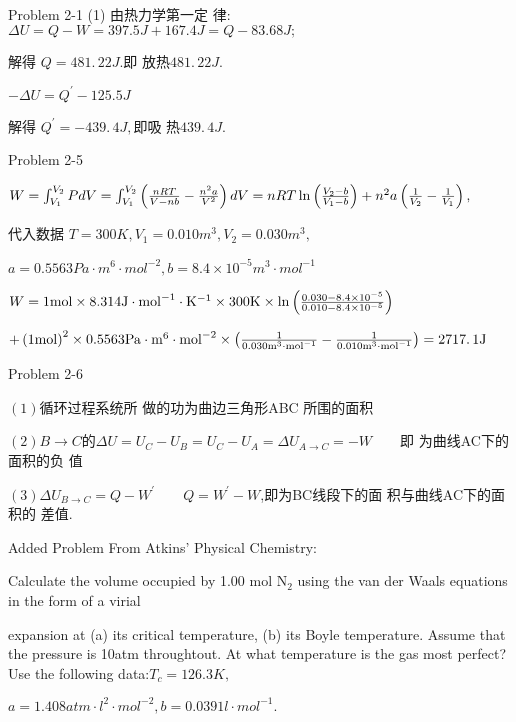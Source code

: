 \documentclass{ctexart}
\begin{document}
Problem 2-1 (1) 由热力学第一定%
律:$\Delta U=Q-W=397.5\unit{J}+167.4\unit{J}=Q-83.68\unit{J};$

解得 $Q=\allowbreak 481.\,\allowbreak 22\unit{J}.$即%
放热$\allowbreak 481.\,\allowbreak 22\unit{J}.$

$-\Delta U=Q^{\prime }-125.5\unit{J}$

解得 $Q^{\prime }=-439.\,\allowbreak 4\unit{J},$即吸%
热$439.\,\allowbreak 4\unit{J}.$

Problem 2-5

$W=\int_{V_{1}}^{V_{2}}PdV=\int_{V_{1}}^{V_{2}}\left( \frac{nRT}{V-nb}-\frac{%
n^{2}a}{V^{2}}\right) dV=nRT\ln \left( \frac{V_{2}-b}{V_{1}-b}\right)
+n^{2}a\left( \frac{1}{V_{2}}-\frac{1}{V_{1}}\right) ,$

代入数据 $T=300\unit{K},V_{1}=0.010\unit{m}%
^{3},V_{2}=0.030\unit{m}^{3},$

$a=0.5563\unit{Pa}\cdot \unit{m}^{6}\cdot \unit{mol}^{-2},b=8.4\times 10^{-5}%
\unit{m}^{3}\cdot \unit{mol}^{-1}$

$W=1\unit{mol}\times 8.314\unit{J}\cdot \unit{mol}^{-1}\cdot \unit{K}%
^{-1}\times 300\unit{K}\times \ln \left( \frac{0.030-8.4\times 10^{-5}}{%
0.010-8.4\times 10^{-5}}\right) $

$+\left( 1\unit{mol}\right) ^{2}\times 0.5563\unit{Pa}\cdot \unit{m}%
^{6}\cdot \unit{mol}^{-2}\times \left( \frac{1}{0.030\unit{m}^{3}\cdot \unit{%
mol}^{-1}}-\frac{1}{0.010\unit{m}^{3}\cdot \unit{mol}^{-1}}\right)
=\allowbreak 2717.\,\allowbreak 1\unit{J}$

Problem 2-6

$\left( 1\right) $循环过程系统所%
做的功为曲边三角形ABC%
所围的面积

$\left( 2\right) B\rightarrow C$的$\Delta
U=U_{C}-U_{B}=U_{C}-U_{A}=\Delta U_{A\rightarrow C}=-W\qquad $即%
为曲线AC下的面积的负%
值

$\left( 3\right) \Delta U_{B\rightarrow C}=Q-W^{\prime }\qquad Q=W^{\prime
}-W$,\qquad 即为BC线段下的面%
积与曲线AC下的面积的%
差值.

Added Problem From Atkins' Physical Chemistry:

Calculate the volume occupied by 1.00 mol N$_{2}$ using the van der Waals
equations in the form of a virial

expansion at (a) its critical temperature, (b) its Boyle temperature. Assume
that the pressure is 10atm throughtout. At what temperature is the gas most
perfect? Use the following data:$T_{c}=126.3\unit{K},$

$a=1.408\unit{atm}\cdot \unit{l}^{2}\cdot \unit{mol}^{-2},b=0.0391\unit{l}%
\cdot \unit{mol}^{-1}.$
\end{document}
